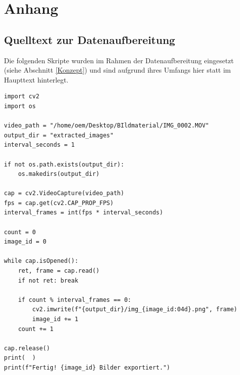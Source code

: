
\chapter{Anhang} \label{Anhang}

\section{Quelltext zur Datenaufbereitung}

Die folgenden Skripte wurden im Rahmen der Datenaufbereitung eingesetzt (siehe Abschnitt \ref{Konzept}) und sind aufgrund ihres Umfangs hier statt im Haupttext hinterlegt.

\begin{lstlisting}[caption=Code zur Umwandlung von .mp4 zu .png, label=lst:mp4topng]
import cv2
import os

video_path = "/home/oem/Desktop/BIldmaterial/IMG_0002.MOV"
output_dir = "extracted_images"
interval_seconds = 1

if not os.path.exists(output_dir):
    os.makedirs(output_dir)

cap = cv2.VideoCapture(video_path)
fps = cap.get(cv2.CAP_PROP_FPS)
interval_frames = int(fps * interval_seconds)

count = 0
image_id = 0

while cap.isOpened():
    ret, frame = cap.read()
    if not ret: break

    if count % interval_frames == 0:
        cv2.imwrite(f"{output_dir}/img_{image_id:04d}.png", frame)
        image_id += 1
    count += 1

cap.release()
print(  )
print(f"Fertig! {image_id} Bilder exportiert.")
\end{lstlisting}

